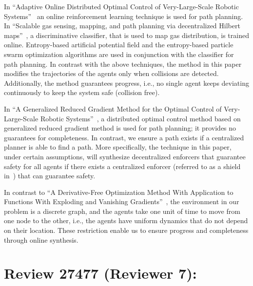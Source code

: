 \documentclass{article}[12pt]
\begin{document}
\begin{enumerate}
In “Adaptive Online Distributed Optimal Control of Very-Large-Scale Robotic Systems”~\cite{Zhu2020AdaptiveOD} an online reinforcement learning technique is used for path planning. In “Scalable gas sensing, mapping, and path planning via decentralized Hilbert maps”~\cite{Zhu2019}, a discriminative classifier, that is used to map gas distribution, is trained online. Entropy-based artificial potential field and the entropy-based particle swarm optimization algorithms are used in conjunction with the classifier for path planning. In contrast with the above techniques, the method in this paper modifies the trajectories of the agents only when collisions are detected. Additionally, the method guarantees progress, i.e., no single agent keeps deviating continuously to keep the system safe (collision free).

In “A Generalized Reduced Gradient Method for the Optimal Control of Very-Large-Scale Robotic Systems”~\cite{Rudd2017}, a distributed optimal control method based on generalized reduced gradient method is used for path planning; it provides no guarantees for completeness.  In contrast, we ensure a path exists if a centralized planner is able to find a path. More specifically, the technique in this paper, under certain assumptions, will synthesize decentralized enforcers that guarantee safety for all agents if there exists a centralized enforcer (referred to as a shield in~\cite{BharNFM}) that can guarantee safety.

In contrast to “A Derivative-Free Optimization Method With Application to Functions With Exploding and Vanishing Gradients”~\cite{AlAbri2020ADO}, the environment in our problem is a discrete graph, and the agents take one unit of time to move from one node to the other, i.e., the agents have uniform dynamics that do not depend on their location. These restriction enable us to ensure progress and completeness through online synthesis.

\end{enumerate}

\section{Review 27477 (Reviewer 7):}
\end{document}
